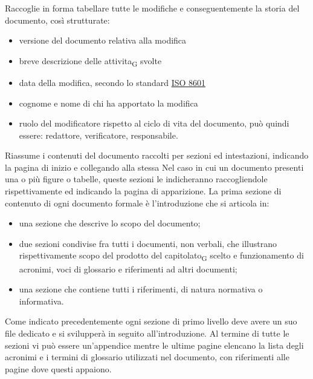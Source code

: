     Raccoglie in forma tabellare tutte le modifiche e conseguentemente la storia del documento, così strutturate:
    \begin{itemize}
        \item versione del documento relativa alla modifica
        \item breve descrizione delle \gls{attivita}\textsubscript{G} svolte
        \item data della modifica, secondo lo standard \href{https://www.iso.org/iso-8601-date-and-time-format.html}{ISO 8601}
        \item cognome e nome di chi ha apportato la modifica
        \item ruolo del modificatore rispetto al ciclo di vita del documento, può quindi essere: redattore, verificatore, responsabile.
    \end{itemize}
    Riassume i contenuti del documento raccolti per sezioni ed intestazioni, indicando la pagina di inizio e collegando alla stessa
    Nel caso in cui un documento presenti una o più figure o tabelle, queste sezioni le indicheranno raccogliendole rispettivamente ed indicando la pagina di apparizione.
    La prima sezione di contenuto di ogni documento formale è l'introduzione che si articola in:
    \begin{itemize}
        \item una sezione che descrive lo scopo del documento;
        \item due sezioni condivise fra tutti i documenti, non verbali, che illustrano rispettivamente scopo del prodotto del \gls{capitolato}\textsubscript{G} scelto e funzionamento di acronimi, voci di glossario e riferimenti ad altri documenti;
        \item una sezione che contiene tutti i riferimenti, di natura normativa o informativa.
    \end{itemize}
    Come indicato precedentemente ogni sezione di primo livello deve avere un suo file dedicato e si svilupperà in seguito all'introduzione. Al termine di tutte le sezioni vi può essere un'appendice mentre le ultime pagine elencano la lista degli acronimi e i termini di glossario utilizzati nel documento, con riferimenti alle pagine dove questi appaiono.

